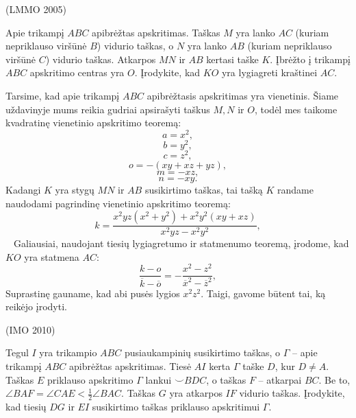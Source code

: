 \documentclass[11pt,a4paper,twoside]{book}
\begin{document}
\begin{pavnr}
(LMMO 2005)

Apie trikampį $ABC$ apibrėžtas apskritimas. Taškas $M$ yra lanko $AC$ (kuriam nepriklauso viršūnė $B$) vidurio taškas, o $N$ yra lanko $AB$ (kuriam nepriklauso viršūnė $C$) vidurio taškas. Atkarpos $MN$ ir $AB$ kertasi taške $K$. Įbrėžto į trikampį $ABC$ apskritimo centras yra $O$. Įrodykite, kad $KO$ yra lygiagreti kraštinei $AC$. 
\end{pavnr}
\begin{sprendimas}
Tarsime, kad apie trikampį $ABC$ apibrėžtasis apskritimas yra vienetinis. Šiame uždavinyje mums reikia gudriai apsirašyti taškus $M, N$ ir $O$, todėl mes taikome kvadratinę vienetinio apskritimo teoremą:
$$a = x^2,$$
$$b=y^2,$$
$$c = z^2,$$
$$ o = - (xy+xz+yz),$$
$$m = - xz,$$
$$ n = - xy.$$
Kadangi $K$ yra stygų $MN$ ir $AB$ susikirtimo taškas, tai tašką $K$ randame naudodami pagrindinę vienetinio apskritimo teoremą:
$$k = \frac{ x^2yz(x^2+y^2)+ x^2 y^2 (xy+xz)}{ x^2 yz - x^2 y^2},$$
$\phantom{a}$ 
Galiausiai, naudojant tiesių lygiagretumo ir statmenumo teoremą, įrodome, kad $KO$ yra statmena $AC$:
$$\frac{k-o}{\overline k - \overline o}  = - \frac{ x^2 - z^2}{\overline x^2 - \overline z^2},$$
Suprastinę gauname, kad abi pusės lygios $x^2 z^2$. Taigi, gavome būtent tai, ką reikėjo įrodyti.
\end{sprendimas}







\begin{pavnr}
(IMO 2010)

Tegul $I$ yra trikampio $ABC$ pusiaukampinių susikirtimo taškas, o $\Gamma$ – apie trikampį $ABC$ apibrėžtas apskritimas. Tiesė $AI$ kerta $\Gamma$ taške $D$, kur $D\ne A$. Taškas $E$ priklauso apskritimo $\Gamma$ lankui $\smile BDC$, o taškas $F$ – atkarpai $BC$. Be to, $\angle BAF = \angle CAE < \frac{1}{2}\angle BAC$. Taškas $G$ yra atkarpos $IF$ vidurio taškas. Įrodykite, kad tiesių $DG$ ir $EI$ susikirtimo taškas priklauso apskritimui $\Gamma$.
\end{pavnr}
\end{document}

